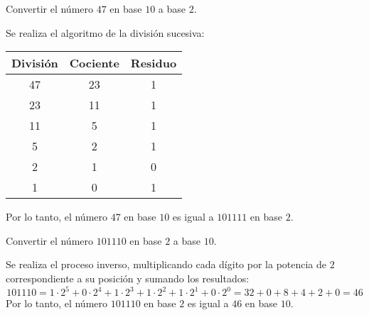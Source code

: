 \begin{ejemplo}
    Convertir el número $47$ en base $10$ a base $2$.
\end{ejemplo}
\begin{solution}
    Se realiza el algoritmo de la división sucesiva:
    \begin{table}[H]
        \centering
        \begin{tabular}{c|c|c}
            \textbf{División} & \textbf{Cociente} & \textbf{Residuo} \\ \hline
            47                & 23                & 1                \\
            23                & 11                & 1                \\
            11                & 5                 & 1                \\
            5                 & 2                 & 1                \\
            2                 & 1                 & 0                \\
            1                 & 0                 & 1
        \end{tabular}
    \end{table}
    Por lo tanto, el número $47$ en base $10$ es igual a $101111$ en base $2$.
\end{solution}

\begin{ejemplo}
    Convertir el número $101110$ en base $2$ a base $10$.
\end{ejemplo}
\begin{solution}
    Se realiza el proceso inverso, multiplicando cada dígito por la potencia de $2$ correspondiente a su posición y sumando los resultados:
    \begin{equation*}
        101110 = 1 \cdot 2^5 + 0 \cdot 2^4 + 1 \cdot 2^3 + 1 \cdot 2^2 + 1 \cdot 2^1 + 0 \cdot 2^0 = 32 + 0 + 8 + 4 + 2 + 0 = 46
    \end{equation*}
    Por lo tanto, el número $101110$ en base $2$ es igual a $46$ en base $10$.
\end{solution}


